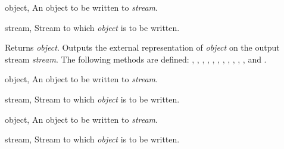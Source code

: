 \begin{optDefinition}

\begin{genericargs}
    \item[object, \classref{object}] An object to be written to {\em stream}.
    \item[stream, \classref{stream}] Stream to which {\em object\/} is to be
    written.
\end{genericargs}
%
\result%
Returns {\em object}.
%
\remarks%
Outputs the external representation of {\em object\/} on the output stream
{\em stream}.
%
\seealso%
The following  methods are defined:
, ,
,
,
, ,
, ,
, ,
, 
and .

\begin{specargs}
    \item[object, \classref{object}] An object to be written to {\em stream}.
    \item[stream, \classref{stream}] Stream to which {\em object\/} is to be
    written.
\end{specargs}

\begin{specargs}
    \item[object, \classref{object}] An object to be written to {\em stream}.
    \item[stream, \classref{buffered-stream}] Stream to which {\em object\/} is
    to be written.
\end{specargs}


\end{optDefinition}
